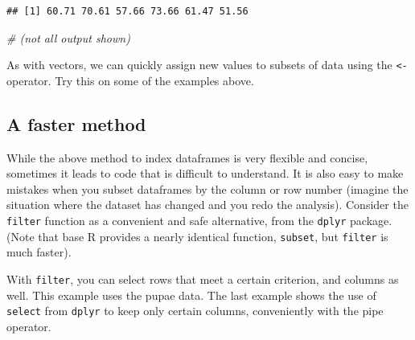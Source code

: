 \documentclass[]{book}
\newenvironment{Shaded}{\begin{snugshade}}{\end{snugshade}}
\newcommand{\CommentTok}[1]{\textcolor[rgb]{0.56,0.35,0.01}{\textit{#1}}}
\newcommand{\DecValTok}[1]{\textcolor[rgb]{0.00,0.00,0.81}{#1}}
\newcommand{\NormalTok}[1]{#1}
\newcommand{\OperatorTok}[1]{\textcolor[rgb]{0.81,0.36,0.00}{\textbf{#1}}}
\newcommand{\StringTok}[1]{\textcolor[rgb]{0.31,0.60,0.02}{#1}}
\let\BeginKnitrBlock\begin \let\EndKnitrBlock\end
\begin{document}
\begin{Shaded}
\end{Shaded}

\begin{verbatim}
## [1] 60.71 70.61 57.66 73.66 61.47 51.56
\end{verbatim}

\begin{Shaded}
\begin{Highlighting}[]
\CommentTok{# (not all output shown)}
\end{Highlighting}
\end{Shaded}

\BeginKnitrBlock{rmdtry}
As with vectors, we can quickly assign new values to subsets of data using the \texttt{\textless{}-} operator. Try this on some of the examples above.
\EndKnitrBlock{rmdtry}

\hypertarget{a-faster-method}{%
\subsection{A faster method}\label{a-faster-method}}

While the above method to index dataframes is very flexible and concise, sometimes it leads to code that is difficult to understand. It is also easy to make mistakes when you subset dataframes by the column or row number (imagine the situation where the dataset has changed and you redo the analysis). Consider the \texttt{filter} function as a convenient and safe alternative, from the \texttt{dplyr} package. (Note that base R provides a nearly identical function, \texttt{subset}, but \texttt{filter} is much faster).

With \texttt{filter}, you can select rows that meet a certain criterion, and columns as well. This example uses the pupae data. The last example shows the use of \texttt{select} from \texttt{dplyr} to keep only certain columns, conveniently with the pipe operator.
\end{document}
